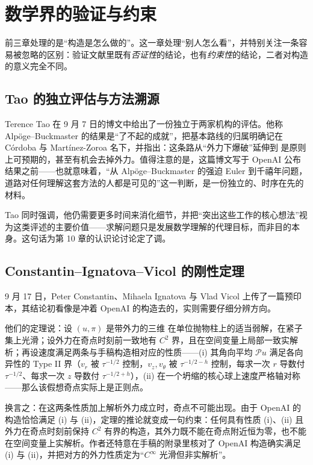 
\section{数学界的验证与约束}

前三章处理的是“构造是怎么做的”。这一章处理“别人怎么看”，并特别关注一条容易被忽略的区别：验证文献里既有\emph{否证性}的结论，也有\emph{约束性}的结论，二者对构造的意义完全不同。

\subsection{Tao 的独立评估与方法溯源}

Terence Tao 在 9 月 7 日的博文\cite{tao-blog-sep7}中给出了一份独立于两家机构的评估。他称 Alpöge--Buckmaster 的结果是“了不起的成就”，把基本路线的归属明确记在 Córdoba 与 Martínez-Zoroa 名下，并指出：这条路从“外力下爆破”延伸到 \NS{} 是原则上可预期的，甚至有机会去掉外力。值得注意的是，这篇博文写于 OpenAI 公布 \NS{} 结果之前——也就意味着，“从 Alpöge--Buckmaster 的强迫 Euler 到千禧年问题，道路对任何理解这套方法的人都是可见的”这一判断，是一份独立的、时序在先的材料。

Tao 同时强调，他仍需要更多时间来消化细节，并把“突出这些工作的核心想法”视为这类评述的主要价值——求解问题只是发展数学理解的代理目标，而非目的本身。这句话为第 10 章的认识论讨论定了调。

\subsection{Constantin--Ignatova--Vicol 的刚性定理}

9 月 17 日，Peter Constantin、Mihaela Ignatova 与 Vlad Vicol 上传了一篇预印本\cite{civ}，其结论初看像是冲着 OpenAI 的构造去的，实则需要仔细分辨方向。

他们的定理说：设 $(u,\pi)$ 是带外力的三维 \NS{} 在单位抛物柱上的适当弱解，在紧子集上光滑；设外力在奇点时刻前一致地有 $C^{2}$ 界，且在空间变量上局部一致实解析；再设速度满足两条与手稿构造相对应的性质——(i) 其角向平均 $\mathcal{P}u$ 满足各向异性的 Type II 界（$v_{r}$ 被 $\tau^{-1/2}$ 控制，$v_{z},v_{\theta}$ 被 $\tau^{-1/2-h}$ 控制，每求一次 $r$ 导数付 $\tau^{-1/2}$、每求一次 $z$ 导数付 $\tau^{-1/2+h}$），(ii) 在一个坍缩的核心球上速度严格轴对称——那么该假想奇点实际上是正则点。

换言之：在这两条性质加上解析外力成立时，奇点不可能出现。由于 OpenAI 的构造恰恰满足 (i) 与 (ii)，定理的推论就变成一句约束：任何具有性质 (i)、(ii) 且外力在奇点时刻前保持 $C^{2}$ 有界的构造，其外力既不能在奇点附近恒为零，也不能在空间变量上实解析。作者还特意在手稿的附录里核对了 OpenAI 构造确实满足 (i) 与 (ii)，并把对方的外力性质定为“$C^{\infty}$ 光滑但非实解析”。

